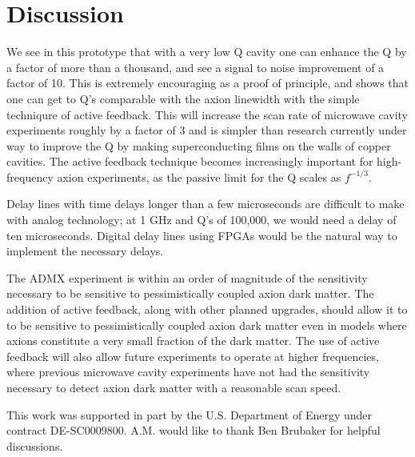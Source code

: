 \documentclass[aps,prl,twocolumn,groupedaddress]{revtex4-1}
\begin{document}
\section{Discussion}

We see in this prototype that with a very low Q cavity one can enhance the Q by a factor of more than a thousand, and see a signal to noise improvement of a factor of 10. This is extremely encouraging as a proof of principle, and shows that one can get to Q's comparable with the axion linewidth with the simple techniqure of active feedback. This will increase the scan rate of microwave cavity experiments roughly by a factor of 3 and is simpler than research currently under way to improve the Q by making superconducting films on the walls of copper cavities. The active feedback technique becomes increasingly important for high-frequency axion experiments, as the passive limit for the Q scales as $f^{-1/3}$.

Delay lines with time delays longer than a few microseconds are difficult to make with analog technology; at 1 GHz and Q's of 100,000, we would need a delay of ten microseconds. Digital delay lines using FPGAs would be the natural way to implement the necessary delays.


The ADMX experiment is within an order of magnitude of the sensitivity necessary to be sensitive to pessimistically coupled axion dark matter.  The addition of active feedback, along with other planned upgrades, should allow it to to be sensitive to pessimistically coupled axion dark matter even in models where axions constitute a very small fraction of the dark matter.  The use of active feedback will also allow future experiments to operate at higher frequencies, where previous microwave cavity experiments have not had the sensitivity necessary to detect axion dark matter with a reasonable scan speed.

This work was supported in part by the U.S. Department of Energy under contract DE-SC0009800. A.M. would like to thank Ben Brubaker for helpful discussions.


\end{document}
